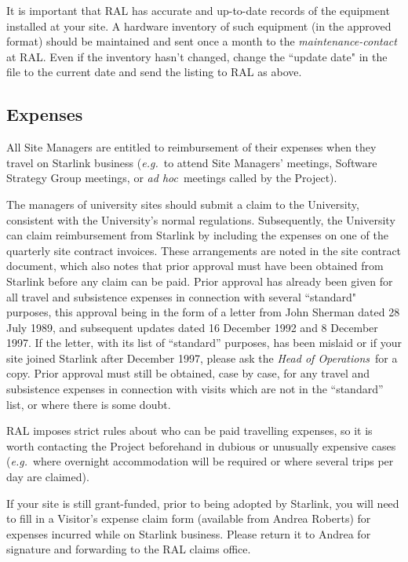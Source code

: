 \documentclass[twoside,11pt]{article}
\begin{document}
It is important that RAL has accurate and up-to-date records of the equipment
installed at your site.
A hardware inventory of such equipment (in the approved format) should be
maintained and sent once a month to the {\em maintenance-contact}\, at RAL.
Even if the inventory hasn't changed, change the ``update date" in the file to
the current date and send the listing to RAL as above.

\subsection{Expenses}

All Site Managers are entitled to reimbursement of their expenses when
they travel on Starlink business ({\em e.g.}\, to attend Site Managers'
meetings, Software Strategy Group meetings, or {\em ad hoc}\, meetings called
by the Project).

The managers of university sites should submit a claim to the University,
consistent with the University's normal regulations.
Subsequently, the University can claim reimbursement from Starlink by
including the expenses on one of the quarterly site contract invoices.
These arrangements are noted in the site contract document, which also notes
that prior approval must have been obtained from Starlink before any claim can
be paid.
Prior approval has already been given for all travel and subsistence expenses
in connection with several ``standard" purposes, this approval being in
the form of a letter from John Sherman dated 28 July 1989, and subsequent
updates dated 16 December 1992 and 8 December 1997.
If the letter, with its list of ``standard'' purposes, has been mislaid or
if your site joined Starlink after December 1997, please ask the
{\em Head of Operations}\, for a copy.
Prior approval must still be obtained, case by case, for any travel and
subsistence expenses in connection with visits which are not in the
``standard'' list, or where there is some doubt.

RAL imposes strict rules about who can be paid travelling expenses, so it is
worth contacting the Project beforehand in dubious or unusually expensive cases
({\em e.g.}\, where overnight accommodation will be required or where several trips
per day are claimed).

If your site is still grant-funded, prior to being adopted by Starlink, you
will need to fill in a Visitor's expense claim form (available from Andrea
Roberts) for expenses incurred while on Starlink business.
Please return it to Andrea for signature and forwarding to the RAL claims
office.
\end{document}
